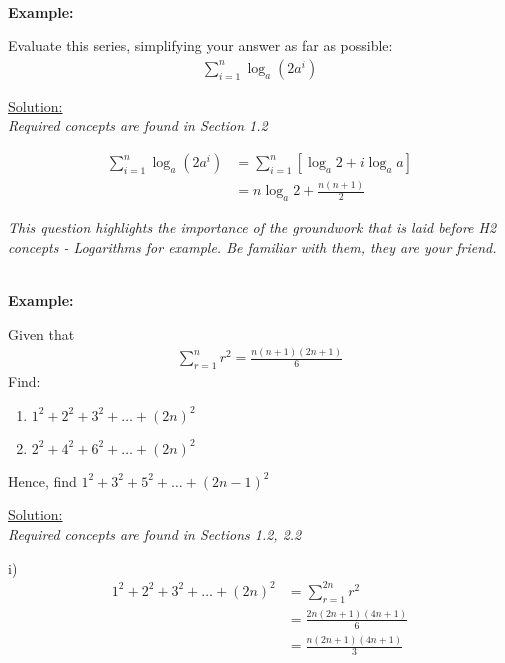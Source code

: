 \documentclass[12pt, a4paper, titlepage]{article}
\begin{document}
\textbf{\\ Example:}

Evaluate this series, simplifying your answer as far as possible:
\begin{align*}
    \sum_{i = 1}^{n} \log_a (2a^i)
\end{align*}

\begin{flushright}
\end{flushright}

\underline{Solution:} \\
\emph{Required concepts are found in Section 1.2}

\begin{align*}
    \sum_{i = 1}^{n} \log_a (2a^i) &= \sum_{i = 1}^{n} [\log_a 2 + i \log_a a] \\
    &= n \log_a 2 + \frac{n(n + 1)}{2}
\end{align*}

\emph{This question highlights the importance of the groundwork that is laid before H2 concepts - Logarithms for example. Be familiar with them, they are your friend.}

\textbf{\\ Example:}

Given that
\begin{align*}
    \sum_{r = 1}^n r^2 = \frac{n(n + 1)(2n + 1)}{6}
\end{align*}
Find:
\begin{enumerate}[label=(\roman*)]
    \item $1^2 + 2^2 + 3^2 + \dots + (2n)^2$
    \item $2^2 + 4^2 + 6^2 + \dots + (2n)^2$
\end{enumerate}
Hence, find $1^2 + 3^2 + 5^2 + \dots + (2n - 1)^2$

\begin{flushright}
\end{flushright}

\underline{Solution:} \\
\emph{Required concepts are found in Sections 1.2, 2.2}

i)
\begin{align*}
    1^2 + 2^2 + 3^2 + \dots + (2n)^2 &= \sum_{r = 1}^{2n} r^2 \\
    &= \frac{2n(2n + 1)(4n + 1)}{6} \\
    &= \frac{n(2n + 1)(4n + 1)}{3}
\end{align*}
\end{document}
